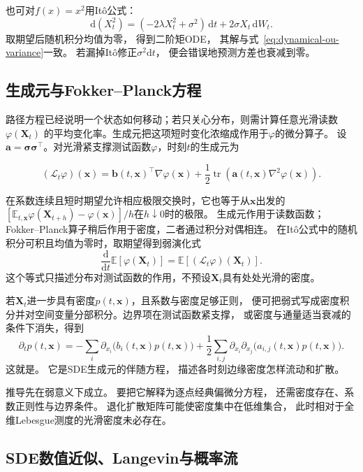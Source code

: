 也可对$f(x)=x^{2}$用Itô公式：
\[
	\mathrm{d}(X_{t}^{2}) = (-2\lambda X_{t}^{2}+\sigma^{2})\,\mathrm{d}t + 2\sigma
	X_{t}\,\mathrm{d}W_{t}.
\]
取期望后随机积分均值为零， 得到二阶矩ODE， 其解与式~\eqref{eq:dynamical-ou-variance}一致。
若漏掉Itô修正$\sigma^{2}\mathrm{d}t$， 便会错误地预测方差也衰减到零。

\subsection{生成元与Fokker--Planck方程}

路径方程已经说明一个状态如何移动；若只关心分布，则需计算任意光滑读数$\varphi(\bm X_t)$
的平均变化率。生成元把这项短时变化浓缩成作用于$\varphi$的微分算子。
设$\bm a=\bm\sigma\bm\sigma^\top$。对光滑紧支撑测试函数$\varphi$，时刻$t$的生成元为
\begin{definition}[Itô扩散的生成元]
\label{def:dynamical-diffusion-generator}
\[
	(\mathcal{L}_t\varphi)(\bm{x})
	=\bm{b}(t,\bm{x})^{\top}\nabla\varphi(\bm{x})
	+\frac12\operatorname{tr}\!\left(\bm{a}(t,\bm{x})\nabla^2\varphi(\bm{x})\right).
\]
\end{definition}
在系数连续且短时期望允许相应极限交换时，它也等于从$\bm x$出发的
$[\mathbb E_{t,\bm x}\varphi(\bm X_{t+h})-\varphi(\bm x)]/h$在$h\downarrow0$时的极限。
生成元作用于读数函数；Fokker--Planck算子稍后作用于密度，二者通过积分对偶相连。
在Itô公式中的随机积分可积且均值为零时，取期望得到弱演化式
\[
	\frac{\mathrm{d}}{\mathrm{d}t}\mathbb{E}[\varphi(\bm{X}_{t})]
	=\mathbb{E}[(\mathcal{L}_t\varphi)(\bm{X}_t)].
\]
这个等式只描述分布对测试函数的作用，不预设$\bm{X}_t$具有处处光滑的密度。

若$\bm{X}_t$进一步具有密度$p(t,\bm{x})$，且系数与密度足够正则，
便可把弱式写成密度积分并对空间变量分部积分。边界项在测试函数紧支撑，
或密度与通量适当衰减的条件下消失，得到
\begin{equation}
	\partial_{t}p(t,\bm{x}) = - \sum_{i}\partial_{x_i}\bigl(b_{i}(t,\bm{x})p(t,\bm{x}
	)\bigr) + \frac{1}{2}\sum_{i,j}\partial_{x_i}\partial_{x_j}\bigl(a_{i,j}(t, \bm
	{x})p(t,\bm{x})\bigr). \label{eq:dynamical-fokker-planck}
\end{equation}
这就是。 它是SDE生成元的伴随方程， 描述各时刻边缘密度怎样流动和扩散。

推导先在弱意义下成立。 要把它解释为逐点经典偏微分方程，
还需密度存在、系数正则性与边界条件。 退化扩散矩阵可能使密度集中在低维集合，
此时相对于全维Lebesgue测度的光滑密度未必存在。

\subsection{SDE数值近似、Langevin与概率流}

